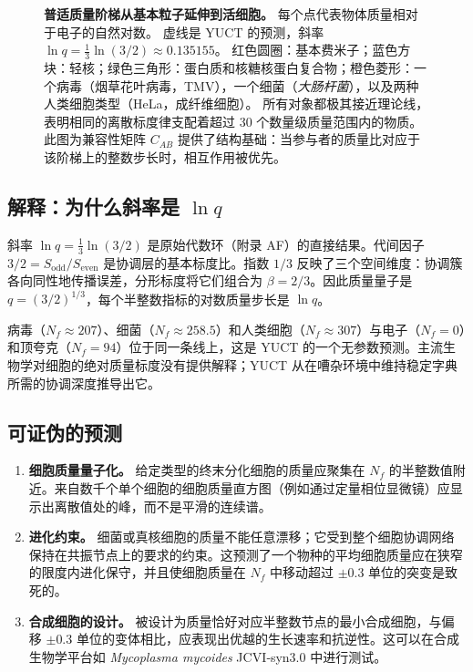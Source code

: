 \documentclass[11pt,a4paper]{article}
\begin{document}
\begin{figure}[H]
		\caption{\textbf{普适质量阶梯从基本粒子延伸到活细胞。}
			每个点代表物体质量相对于电子的自然对数。
			虚线是 YUCT 的预测，斜率 \(\ln q = \frac{1}{3}\ln(3/2) \approx 0.135155\)。
			红色圆圈：基本费米子；蓝色方块：轻核；绿色三角形：蛋白质和核糖核蛋白复合物；橙色菱形：一个病毒（烟草花叶病毒，TMV），一个细菌（\textit{大肠杆菌}），以及两种人类细胞类型（HeLa，成纤维细胞）。
			所有对象都极其接近理论线，表明相同的离散标度律支配着超过 30 个数量级质量范围内的物质。
			此图为兼容性矩阵 \(C_{AB}\) 提供了结构基础：当参与者的质量比对应于该阶梯上的整数步长时，相互作用被优先。}
		\label{fig:ladder_cells}
	\end{figure}
	
	\subsection{解释：为什么斜率是 \(\ln q\)}
	
	斜率 \(\ln q = \frac{1}{3}\ln(3/2)\) 是原始代数环（附录 AF）的直接结果。代间因子 \(3/2 = S_{\mathrm{odd}}/S_{\mathrm{even}}\) 是协调层的基本标度比。指数 \(1/3\) 反映了三个空间维度：协调簇各向同性地传播误差，分形标度将它们组合为 \(\beta = 2/3\)。因此质量量子是 \(q = (3/2)^{1/3}\)，每个半整数指标的对数质量步长是 \(\ln q\)。
	
	病毒（\(N_f \approx 207\)）、细菌（\(N_f \approx 258.5\)）和人类细胞（\(N_f \approx 307\)）与电子（\(N_f = 0\)）和顶夸克（\(N_f = 94\)）位于同一条线上，这是 YUCT 的一个无参数预测。主流生物学对细胞的绝对质量标度没有提供解释；YUCT 从在嘈杂环境中维持稳定字典所需的协调深度推导出它。
	
	\subsection{可证伪的预测}
	\begin{enumerate}
		\item \textbf{细胞质量量子化。} 给定类型的终末分化细胞的质量应聚集在 \(N_f\) 的半整数值附近。来自数千个单个细胞的细胞质量直方图（例如通过定量相位显微镜）应显示出离散值处的峰，而不是平滑的连续谱。
		\item \textbf{进化约束。} 细菌或真核细胞的质量不能任意漂移；它受到整个细胞协调网络保持在共振节点上的要求的约束。这预测了一个物种的平均细胞质量应在狭窄的限度内进化保守，并且使细胞质量在 \(N_f\) 中移动超过 \(\pm 0.3\) 单位的突变是致死的。
		\item \textbf{合成细胞的设计。} 被设计为质量恰好对应半整数节点的最小合成细胞，与偏移 \(\pm 0.3\) 单位的变体相比，应表现出优越的生长速率和抗逆性。这可以在合成生物学平台如 \textit{Mycoplasma mycoides} JCVI‑syn3.0 中进行测试。
	\end{enumerate}
	
\end{document}
